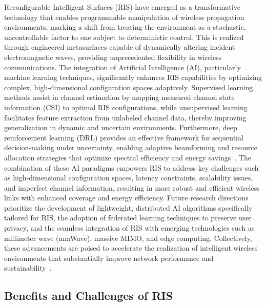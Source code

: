 \documentclass[sigconf]{acmart}
\begin{document}
Reconfigurable Intelligent Surfaces (RIS) have emerged as a transformative technology that enables programmable manipulation of wireless propagation environments, marking a shift from treating the environment as a stochastic, uncontrollable factor to one subject to deterministic control. This is realized through engineered metasurfaces capable of dynamically altering incident electromagnetic waves, providing unprecedented flexibility in wireless communications. The integration of Artificial Intelligence (AI), particularly machine learning techniques, significantly enhances RIS capabilities by optimizing complex, high-dimensional configuration spaces adaptively. Supervised learning methods assist in channel estimation by mapping measured channel state information (CSI) to optimal RIS configurations, while unsupervised learning facilitates feature extraction from unlabeled channel data, thereby improving generalization in dynamic and uncertain environments. Furthermore, deep reinforcement learning (DRL) provides an effective framework for sequential decision-making under uncertainty, enabling adaptive beamforming and resource allocation strategies that optimize spectral efficiency and energy savings~\cite{ref49}. The combination of these AI paradigms empowers RIS to address key challenges such as high-dimensional configuration spaces, latency constraints, scalability issues, and imperfect channel information, resulting in more robust and efficient wireless links with enhanced coverage and energy efficiency. Future research directions prioritize the development of lightweight, distributed AI algorithms specifically tailored for RIS, the adoption of federated learning techniques to preserve user privacy, and the seamless integration of RIS with emerging technologies such as millimeter wave (mmWave), massive MIMO, and edge computing. Collectively, these advancements are poised to accelerate the realization of intelligent wireless environments that substantially improve network performance and sustainability~\cite{ref49}.

\subsection{Benefits and Challenges of RIS}
\end{document}
